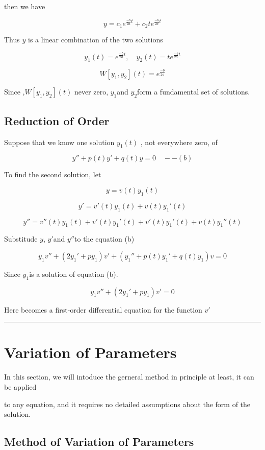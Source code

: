 \documentclass[12pt, a4paper]{article}
\theoremstyle{break}
\begin{document}
then we have

\[
y = c_1 e^{\frac{-b}{2a}t} + c_2 t e^{\frac{-b}{2a}t}
\]

Thus \(y\) is a linear combination of the two solutions

\[
y_1(t) = e^{\frac{-b}{2a}t}, \quad y_2(t) = t e^{\frac{-b}{2a}t}
\]

\[
W[y_1 ,y_2](t) = e^{\frac{-b}{2a}}
\]

Since ,\(W[y_1 ,y_2](t)\) never zero, \(y_1\)and \(y_2\)form a fundamental set of solutions.

\subsection{Reduction of Order}\label{reduction-of-order}

Suppose that we know one solution \(y_1(t)\) , not everywhere zero, of

\[
y'' + p(t)y' + q(t)y = 0 \quad --(b)
\]

To find the second solution, let

\[
y = v(t) y_1(t)
\]

\[
y' = v'(t)y_1(t) + v(t)y_1'(t)
\]

\[
y'' = v''(t)y_1(t) + v'(t)y_1'(t) + v'(t)y_1'(t) + v(t)y_1''(t)
\]

Substitude \(y\), \(y'\)and \(y''\)to the equation (b)

\[
y_1 v'' + (2y_1' + py_1)v' + (y_1'' + p(t)y_1' + q(t)y_1)v = 0
\]

Since \(y_1\)is a solution of equation (b).

\[
y_1 v'' + (2y_1' + py_1)v' = 0
\]

Here becomes a first-order differential equation for the function \(v'\)

\begin{center}\rule{0.5\linewidth}{0.5pt}\end{center}

\section{Variation of Parameters}\label{variation-of-parameters}

In this section, we will intoduce the gerneral method in principle at least, it can be applied

to any equation, and it requires no detailed assumptions about the form of the solution.

\subsection{Method of Variation of Parameters}\label{method-of-variation-of-parameters}
\end{document}
